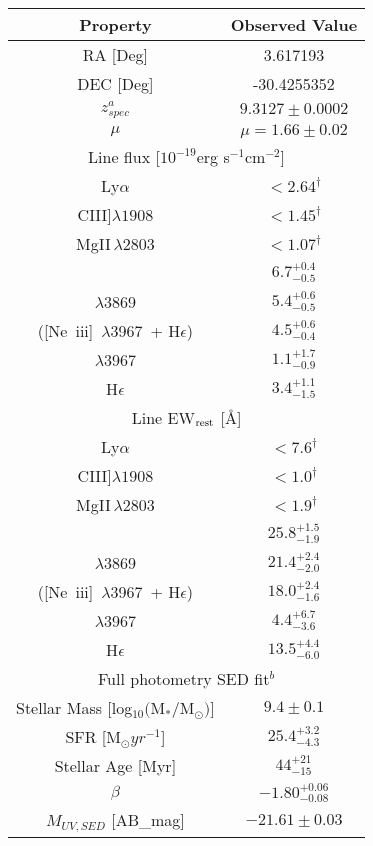 \documentclass[sn-mathphys]{sn-jnl}%
\theoremstyle{thmstyleone}%
\theoremstyle{thmstyletwo}%
\theoremstyle{thmstylethree}%
\newcommand{\Oii}{[O~{\sc ii}]}
\newcommand{\Neiiia}{[Ne~{\sc iii}]~$\lambda$3869}
\newcommand{\Neiiib}{[Ne~{\sc iii}]~$\lambda$3967}
\begin{document}



\begin{table}
\centering
\begin{tabular}{cc}
Property   & Observed Value                             \\\hline \hline
RA [Deg]  & 3.617193\\
DEC [Deg] & -30.4255352\\
$z_{spec}^a$   & $9.3127\pm0.0002$\\
$\mu$  & $\mu=1.66\pm0.02$ \\
\hline \hline
\multicolumn{2}{c}{Line flux  [$10^{-19}$erg s$^{-1}$cm$^{-2}$]} \\
\hline
Ly$\alpha$ & $<2.64^\dag$\\
CIII]$\lambda1908$ & $<1.45^\dag$\\
MgII$\,\lambda2803$ & $<1.07^\dag$\\
\Oii\ & $6.7^{+0.4}_{-0.5}$ \\
\Neiiia\ &  $5.4^{+0.6}_{-0.5}$ \\
(\Neiiib\ + H$\epsilon$)  & $4.5^{+0.6}_{-0.4}$ \\
\Neiiib\  & $1.1^{+1.7}_{-0.9}$ \\ 
H$\epsilon$  & $3.4^{+1.1}_{-1.5}$ \\
\hline \hline
\multicolumn{2}{c}{Line EW$_{\rm rest}$ [\AA]} \\
\hline
Ly$\alpha$ & $<7.6^\dag$\\
CIII]$\lambda1908$ & $<1.0^\dag$\\
MgII$\,\lambda2803$ & $<1.9^\dag$\\
\Oii\ & $25.8^{+1.5}_{-1.9}$ \\
\Neiiia\  &  $21.4^{+2.4}_{-2.0}$ \\
(\Neiiib\ + H$\epsilon$)& $18.0^{+2.4}_{-1.6}$ \\
\Neiiib\  & $4.4^{+6.7}_{-3.6}$ \\ 
H$\epsilon$  & $13.5^{+4.4}_{-6.0}$ \\
\hline \hline
\multicolumn{2}{c}{Full photometry SED fit$^b$}\\
\hline
Stellar Mass [log$_{10}($M$_*/$M$_\odot)$] &$9.4\pm0.1$\\
SFR  [M$_\odot yr^{-1}$] & $25.4_{-4.3}^{+3.2}$ \\
Stellar Age [Myr] &  $44^{+21}_{-15}$\\
$\beta$  & $-1.80_{-0.08}^{+0.06}$ \\
$M_{UV, SED}$ [AB\_mag] & $-21.61\pm0.03$ \\

\end{tabular}
\end{table}
\end{document}
